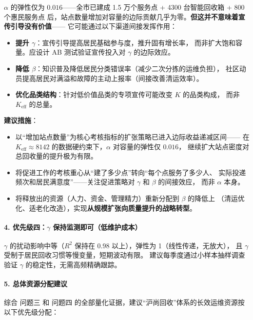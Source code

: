 \documentclass[12pt,a4paper]{ctexart}
\begin{document}
\begin{table}[htbp]
$\alpha$ 的弹性仅为 $0.016$——全市已建成 1.5 万个服务点 + 4300 台智能回收箱 + 800 个惠民服务点
后，站点数量增加对容量的边际贡献几乎为零。\textbf{但这并不意味着宣传引导没有价值}——
它可能通过以下渠道间接发挥作用：

\begin{itemize}
  \item \textbf{提升 $\gamma$}：宣传引导提高居民基础参与度，推升固有增长率，
        而非扩大饱和容量。应设计 AB 测试验证宣传投入对 $\gamma$ 的边际效应。
  \item \textbf{降低 $\beta$}：知识普及降低居民分类错误率（减少二次分拣的运维负担），
        社区动员提高居民对满溢和故障的主动上报率（间接改善清运效率）。
  \item \textbf{优化品类结构}：针对低价值品类的专项宣传可能改变 $K$ 的品类构成，
        而非 $K_{\text{eff}}$ 的总量。
\end{itemize}

\textbf{建议措施}：
\begin{itemize}
  \item 以``增加站点数量''为核心考核指标的扩张策略已进入边际收益递减区间——
        在 $K_{\text{eff}} \approx 8142$ 的数据硬约束下，$\alpha$ 对容量的弹性仅 $0.016$，
        继续扩大站点密度对总回收量的提升极为有限。
  \item 将促进工作的考核重心从``建了多少点''转向``每个点服务了多少人、
        实际投递频次和居民满意度''——关注促进策略对 $\gamma$ 和 $\beta$ 的间接效应，
        而非 $\alpha$ 本身。
  \item 将释放出的资源（人力、资金、管理精力）重新分配到 $\beta$ 的降低上
        （清运优化、适老化改造），实现\textbf{从规模扩张向质量提升的战略转型}。
\end{itemize}

\paragraph*{4. 优先级四：$\gamma$ 保持监测即可（低维护成本）}

$\gamma$ 的扰动影响中等（$R^2$ 保持在 $0.98$ 以上），弹性为 1（线性传递，无放大），
且 $\gamma$ 受制于居民回收习惯等慢变量，短期波动有限。
建议每季度通过小样本抽样调查验证 $\gamma$ 的稳定性，无需高频精确跟踪。

\paragraph*{5. 总体资源分配建议}

综合 问题三 和 问题四 的全部量化证据，建议``沪尚回收''体系的长效运维资源按以下优先级分配：


\end{table}
\end{document}
